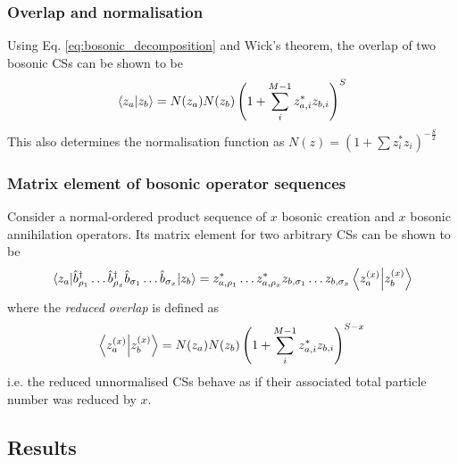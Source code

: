 \subsubsection{Overlap and normalisation}
Using Eq. \ref{eq:bosonic_decomposition} and Wick's theorem, the overlap of two bosonic CSs can be shown \cite{grossmann} to be
\begin{equation}
\braket{z_a}{z_b}=N(z_a)N(z_b)\left(1+\sum_i^{M-1}z_{a,i}^*z_{b,i}\right)^S
\end{equation}
This also determines the normalisation function as
$N(z)=\left(1+\sum z_i^*z_i\right)^{-\frac{S}{2}}$


\subsubsection{Matrix element of bosonic operator sequences}
Consider a normal-ordered product sequence of $x$ bosonic creation and $x$ bosonic annihilation operators. Its matrix element for two arbitrary CSs can be shown \cite{grossmann} to be
\begin{equation}
\mel{z_a}{\hat{b}^\dagger_{\rho_1}\dots\hat{b}^\dagger_{\rho_x}\hat{b}_{\sigma_1}\dots\hat{b}_{\sigma_x}}{z_b}=z_{a,\rho_1}^*\dots z_{a,\rho_x}^*z_{b,\sigma_1}\dots z_{b,\sigma_x} \braket{z_a^{(x)}}{z_b^{(x)}}
\end{equation}
where the \textit{reduced overlap} is defined as
\begin{equation}
\braket{z_a^{(x)}}{z_b^{(x)}}=N(z_a)N(z_b)\left(1+\sum_i^{M-1}z_{a,i}^*z_{b,i}\right)^{S-x}
\end{equation}
i.e. the reduced unnormalised CSs behave as if their associated total particle number was reduced by $x$.


\subsection{Results}
